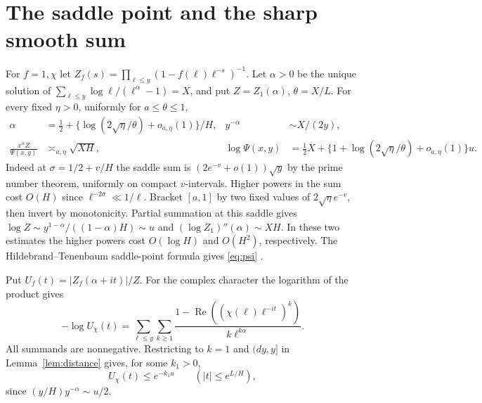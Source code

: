\documentclass[11pt]{article}
\newcommand{\re}{\operatorname{Re}}
\begin{document}
\section{The saddle point and the sharp smooth sum}
For \(f=1,\chi\) let \(Z_f(s)=\prod_{\ell\le y}(1-f(\ell)\ell^{-s})^{-1}\).
Let \(\alpha>0\) be the unique solution of
\(\sum_{\ell\le y}\log\ell/(\ell^\alpha-1)=X\), and put
\(Z=Z_1(\alpha)\), \(\theta=X/L\). For every fixed \(\eta>0\), uniformly for \(a\le\theta\le1\),
\begin{align}
 \alpha&=\tfrac12+
      \{\log(2\sqrt\eta/\theta)+o_{a,\eta}(1)\}/H,
 & y^{-\alpha}&\sim X/(2y),\label{eq:saddle}\\
 \frac{x^\alpha Z}{\Psi(x,y)}&\asymp_{a,\eta}\sqrt{XH},
 &\log\Psi(x,y)&=\tfrac12 X+
   \{1+\log(2\sqrt\eta/\theta)+o_{a,\eta}(1)\}u.\label{eq:psi}
\end{align}
Indeed at \(\sigma=1/2+v/H\) the saddle sum is
\((2e^{-v}+o(1))\sqrt y\) by the prime number theorem, uniformly on
compact \(v\)-intervals. Higher powers in the sum cost \(O(H)\) since
\(\ell^{-2\sigma}\ll1/\ell\). Bracket \([a,1]\) by two fixed values
of \(2\sqrt\eta e^{-v}\), then invert by monotonicity.
Partial summation at this saddle gives
\(\log Z\sim y^{1-\alpha}/((1-\alpha)H)\sim u\) and
\((\log Z_1)''(\alpha)\sim XH\). In these two estimates the higher
powers cost \(O(\log H)\) and \(O(H^2)\), respectively.
The Hildebrand--Tenenbaum saddle-point formula gives \eqref{eq:psi}
\cite[Theorem 1.6]{ht}.

Put \(U_f(t)=|Z_f(\alpha+it)|/Z\). For the complex character the
logarithm of the product gives
\[
 -\log U_\chi(t)=
 \sum_{\ell\le y}\sum_{k\ge1}
 \frac{1-\re((\chi(\ell)\ell^{-it})^k)}{k\ell^{k\alpha}}.
\]
All summands are nonnegative. Restricting to \(k=1\) and \((dy,y]\)
in Lemma~\ref{lem:distance} gives, for some \(k_1>0\),
\begin{equation}\label{eq:Us}
 U_\chi(t)\le e^{-k_1u}\qquad (|t|\le e^{L/H}),
\end{equation}
since \((y/H)y^{-\alpha}\sim u/2\).
\end{document}
